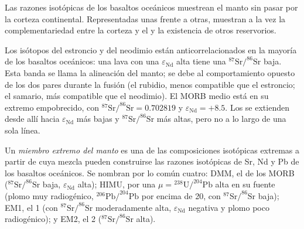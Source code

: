 Las razones isotópicas de los basaltos oceánicos muestrean el manto sin pasar por
la corteza continental. Representadas unas frente a otras, muestran a la vez la
complementariedad entre la corteza y el  y la existencia de otros
reservorios.

Los isótopos del estroncio y del neodimio están anticorrelacionados en la mayoría de los basaltos oceánicos: una
lava con una $\varepsilon_{\mathrm{Nd}}$ alta tiene una
$^{87}\mathrm{Sr}/^{86}\mathrm{Sr}$ baja. Esta banda se llama la alineación del manto; se debe
al comportamiento opuesto de los dos pares durante la fusión (el rubidio, menos
compatible que el estroncio; el samario, más compatible que el neodimio). El MORB
medio está en su extremo empobrecido, con $^{87}\mathrm{Sr}/^{86}\mathrm{Sr} = 0.702819$ y
$\varepsilon_{\mathrm{Nd}} = +8.5$. Los  se extienden desde allí hacia
$\varepsilon_{\mathrm{Nd}}$ más bajas y $^{87}\mathrm{Sr}/^{86}\mathrm{Sr}$ más altas, pero no
a lo largo de una sola línea.

\begin{definition}\label{def:b2:isotope-geochemistry:end-members}
Un \emph{miembro extremo del manto} es una de las composiciones
isotópicas extremas a partir de cuya mezcla pueden construirse las razones isotópicas de Sr, Nd y Pb de los
basaltos oceánicos. Se nombran por lo común cuatro: DMM, el  de los MORB ($^{87}\mathrm{Sr}/^{86}\mathrm{Sr}$ baja, $\varepsilon_{\mathrm{Nd}}$ alta);
HIMU, por una $\mu = {}^{238}\mathrm{U}/^{204}\mathrm{Pb}$ alta en su fuente
(plomo muy radiogénico, $^{206}\mathrm{Pb}/^{204}\mathrm{Pb}$ por encima de 20, con
$^{87}\mathrm{Sr}/^{86}\mathrm{Sr}$ baja); EM1, el  1 (con
$^{87}\mathrm{Sr}/^{86}\mathrm{Sr}$ moderadamente alta, $\varepsilon_{\mathrm{Nd}}$ negativa y plomo
poco radiogénico); y EM2, el  2 ($^{87}\mathrm{Sr}/^{86}\mathrm{Sr}$ alta).
\end{definition}

